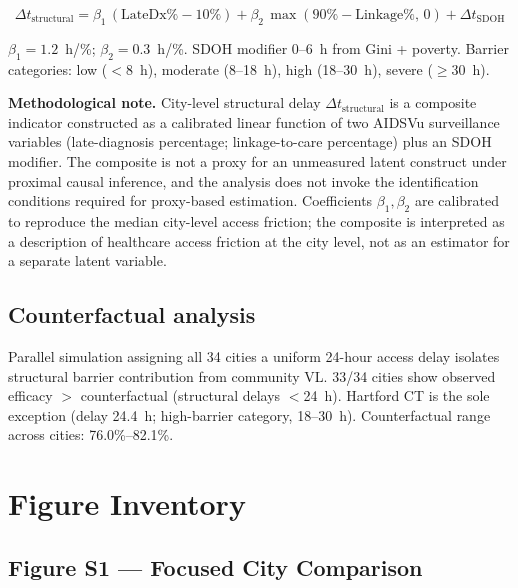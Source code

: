 \documentclass[11pt]{article}
\theoremstyle{definition}
\theoremstyle{remark}
\begin{document}
\begin{equation}
\Delta t_{\text{structural}} = \beta_{1}\,(\text{LateDx}\% - 10\%) + \beta_{2}\,\max(90\% - \text{Linkage}\%,\,0) + \Delta t_{\text{SDOH}}
\label{eq:delay_si}
\end{equation}

$\beta_{1} = 1.2$~h/\%; $\beta_{2} = 0.3$~h/\%. SDOH modifier 0--6~h from Gini + poverty. Barrier categories: low ($<$8~h), moderate (8--18~h), high (18--30~h), severe ($\geq$30~h).

\textbf{Methodological note.} City-level structural delay $\Delta t_{\text{structural}}$ is a composite indicator constructed as a calibrated linear function of two AIDSVu surveillance variables (late-diagnosis percentage; linkage-to-care percentage) plus an SDOH modifier. The composite is not a proxy for an unmeasured latent construct under proximal causal inference\cite{tchetgentchetgen2020_si}, and the analysis does not invoke the identification conditions required for proxy-based estimation\cite{pearl2009_si}. Coefficients $\beta_{1}, \beta_{2}$ are calibrated to reproduce the median city-level access friction; the composite is interpreted as a description of healthcare access friction at the city level,  not as an estimator for a separate latent variable.

\subsection{Counterfactual analysis}

Parallel simulation assigning all 34 cities a uniform 24-hour access delay isolates structural barrier contribution from community VL. 33/34 cities show observed efficacy $>$ counterfactual (structural delays $<$24~h). Hartford CT is the sole exception (delay 24.4~h; high-barrier category, 18--30~h). Counterfactual range across cities: 76.0\%--82.1\%.


\section{Figure Inventory}

\subsection{Figure S1 --- Focused City Comparison}
\end{document}
